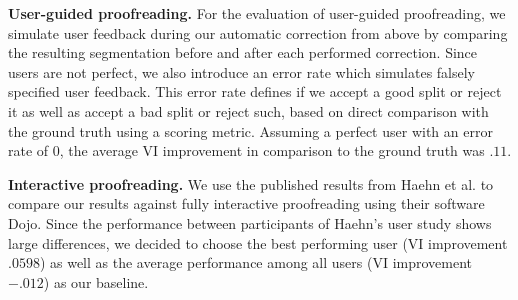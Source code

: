 \textbf{User-guided proofreading.} For the evaluation of user-guided proofreading, we simulate user feedback during our automatic correction from above by comparing the resulting segmentation before and after each performed correction. Since users are not perfect, we also introduce an error rate which simulates falsely specified user feedback. This error rate defines if we accept a good split or reject it as well as accept a bad split or reject such, based on direct comparison with the ground truth using a scoring metric. Assuming a perfect user with an error rate of 0, the average VI improvement in comparison to the ground truth was $.11$.

\textbf{Interactive proofreading.} We use the published results from Haehn et al. to compare our results against fully interactive proofreading using their software Dojo. Since the performance between participants of Haehn's user study shows large differences, we decided to choose the best performing user (VI improvement $.0598$) as well as the average performance among all users (VI improvement $-.012$) as our baseline.

